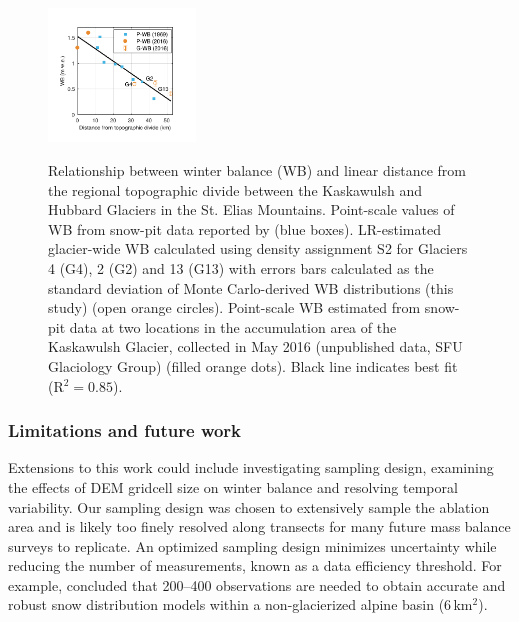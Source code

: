 \documentclass[review,oneside, letterpaper]{igs}
\begin{document}
\begin{figure}
	\centering
	\includegraphics[width =0.35\textwidth]{AccumGrad.pdf}\\
	\caption{Relationship between winter balance (WB) and linear distance from the regional topographic divide between the Kaskawulsh and Hubbard Glaciers in the St. Elias Mountains. Point-scale values of WB from snow-pit data reported by \cite{Taylor1969} (blue boxes). LR-estimated glacier-wide WB calculated using density assignment S2 for Glaciers 4 (G4), 2 (G2) and 13 (G13) with errors bars calculated as the standard deviation of Monte Carlo-derived WB distributions (this study) (open orange circles). Point-scale WB estimated from snow-pit data at two locations in the accumulation area of the Kaskawulsh Glacier, collected in May 2016 (unpublished data, SFU Glaciology Group) (filled orange dots). Black line indicates best fit (R$^2=0.85$).}
	\label{fig:AccumGrad}
\end{figure}


\subsubsection{Limitations and future work}

Extensions to this work could include investigating sampling design, examining the effects of DEM gridcell size on winter balance and resolving temporal variability. Our sampling design was chosen to extensively sample the ablation area and is likely too finely resolved along transects for many future mass balance surveys to replicate. An optimized sampling design minimizes uncertainty while reducing the number of measurements, known as a data efficiency threshold. For example, \cite{Lopez2010} concluded that 200--400 observations are needed to obtain accurate and robust snow distribution models within a non-glacierized alpine basin (6\,km$^2$). 
\end{document}
